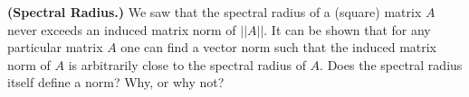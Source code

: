 \textbf{(Spectral Radius.)} We saw that the spectral radius of a
(square) matrix $A$ never exceeds an induced matrix norm of $||A||$.
It can be shown that for any particular matrix $A$ one can find a
vector norm such that the induced matrix norm of $A$ is arbitrarily
close to the spectral radius of $A$. Does the spectral radius itself
define a norm? Why, or why not?

{\color{blue}


}
